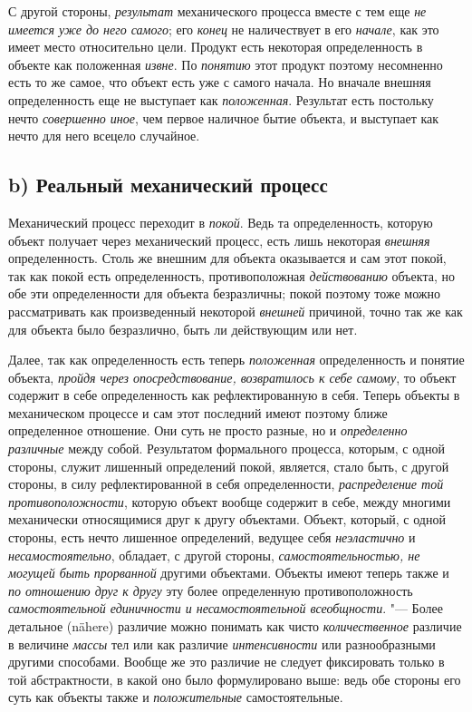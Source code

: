 С другой стороны,
{\em результат}
механического процесса вместе с тем еще
{\em не имеется уже до него самого};
его {\em конец}
не наличествует в его
{\em начале}, как это
имеет место относительно цели. Продукт есть некоторая определенность в
объекте как положенная {\em извне}.
По {\em понятию}
этот продукт поэтому несомненно есть то же самое, что объект
есть уже с самого начала. Но вначале внешняя определенность еще не
выступает как {\em положенная}.
Результат есть постольку нечто
{\em совершенно иное},
чем первое наличное бытие объекта, и выступает как нечто для
него всецело случайное.

\subsection[b) Реальный механический процесс]{b) Реальный механический процесс}
Механический процесс переходит в
{\em покой}. Ведь та
определенность, которую объект получает через механический процесс, есть
лишь некоторая {\em внешняя}
определенность. Столь же внешним для объекта оказывается и
сам этот покой, так как покой есть определенность, противоположная
{\em действованию}
объекта, но обе эти определенности для объекта безразличны;
покой поэтому тоже можно рассматривать как произведенный некоторой
{\em внешней} причиной,
точно так же как для объекта было безразлично, быть ли действующим или нет.

Далее, так как определенность есть теперь
{\em положенная}
определенность и понятие объекта,
{\em пройдя через опосредствование,
возвратилось к себе самому}, то объект содержит в себе
определенность как рефлектированную в себя. Теперь объекты в
механическом процессе и сам этот последний имеют поэтому ближе определенное
отношение. Они суть не просто разные, но и
{\em определенно различные}
между собой. Результатом формального процесса, которым, с
одной стороны, служит лишенный определений покой, является, стало быть, с
другой стороны, в силу рефлектированной в себя определенности,
{\em распределение той
противоположности}, которую объект вообще содержит в себе,
между многими механически относящимися друг к другу объектами. Объект,
который, с одной стороны, есть нечто лишенное определений, ведущее себя
{\em неэластично} и
{\em несамостоятельно},
обладает, с другой стороны,
{\em самостоятельностью, не могущей быть
прорванной }другими объектами. Объекты имеют теперь также и
{\em по отношению друг к другу}
эту более определенную противоположность
{\em самостоятельной единичности и
несамостоятельной всеобщности}. "--- Более детальное (nähere)
различие можно понимать как чисто
{\em количественное}
различие в величине
{\em массы} тел или как
различие {\em интенсивности}
или разнообразными другими способами. Вообще же это различие
не следует фиксировать только в той абстрактности, в какой оно было
формулировано выше: ведь обе стороны его суть как объекты также и
{\em положительные}
самостоятельные.

